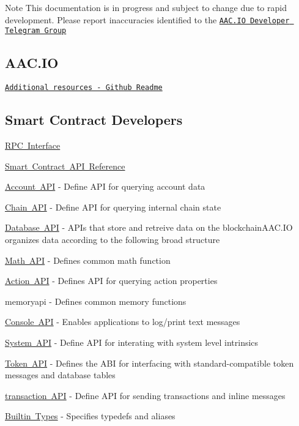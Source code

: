\begin{DoxyNote}{Note}
This documentation is in progress and subject to change due to rapid development. Please report inaccuracies identified to the \href{https://t.me/joinchat/EaEnSUPktgfoI-XPfMYtcQ}{\tt A\+A\+C.\+IO Developer Telegram Group}
\end{DoxyNote}
\subsection*{A\+A\+C.\+IO}


\begin{DoxyItemize}
\item \href{https://github.com/AACIO/aac#readme}{\tt Additional resources -\/ Github Readme}
\end{DoxyItemize}

\subsection*{Smart Contract Developers}


\begin{DoxyItemize}
\item \mbox{\hyperlink{group__aaciorpc}{R\+PC Interface}}
\item \mbox{\hyperlink{group__contractdev}{Smart Contract A\+PI Reference}}
\begin{DoxyItemize}
\item \mbox{\hyperlink{group__accountapi}{Account A\+PI}} -\/ Define A\+PI for querying account data
\item \mbox{\hyperlink{group__chainapi}{Chain A\+PI}} -\/ Define A\+PI for querying internal chain state
\item \mbox{\hyperlink{group__database}{Database A\+PI}} -\/ A\+P\+Is that store and retreive data on the blockchain\+A\+A\+C.\+IO organizes data according to the following broad structure
\item \mbox{\hyperlink{group__mathapi}{Math A\+PI}} -\/ Defines common math function
\item \mbox{\hyperlink{group__actionapi}{Action A\+PI}} -\/ Defines A\+PI for querying action properties
\item memoryapi -\/ Defines common memory functions
\item \mbox{\hyperlink{group__consoleapi}{Console A\+PI}} -\/ Enables applications to log/print text messages
\item \mbox{\hyperlink{group__systemapi}{System A\+PI}} -\/ Define A\+PI for interating with system level intrinsics
\item \mbox{\hyperlink{group__tokens}{Token A\+PI}} -\/ Defines the A\+BI for interfacing with standard-\/compatible token messages and database tables
\item \mbox{\hyperlink{group__transactionapi}{transaction A\+PI}} -\/ Define A\+PI for sending transactions and inline messages
\item \mbox{\hyperlink{group__types}{Builtin Types}} -\/ Specifies typedefs and aliases 
\end{DoxyItemize}
\end{DoxyItemize}